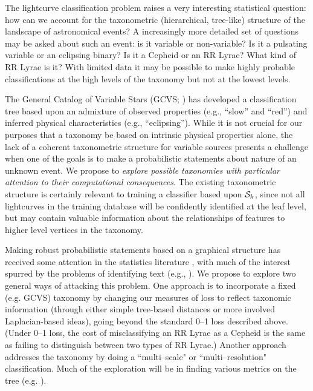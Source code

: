The lightcurve classification problem raises a very interesting statistical
question: how can we account for the taxonometric (hierarchical, tree-like)
structure of the landscape of astronomical events? A increasingly more detailed
set of questions may be asked about such an event: is it variable or
non-variable? Is it a pulsating variable or an eclipsing binary?  Is it a
Cepheid or an RR Lyrae? What kind of RR Lyrae is it?  With limited data it may
be possible to make highly probable classifications at the high levels of the
taxonomy but not at the lowest levels.

The General Catalog of Variable Stars (GCVS; \citealt{ksf+96}) has developed a
classification tree based upon an admixture of observed properties (e.g.,
``slow'' and ``red'') and inferred physical characteristics (e.g.,
``eclipsing'').  While it is not crucial for our purposes that a taxonomy be
based on intrinsic physical properties alone, the lack of a coherent
taxonometric structure for variable sources presents a challenge when one of the
goals is to make a  probabilistic statements about nature of an unknown event.
We propose to {\it explore possible taxonomies with particular attention to
their computational consequences}.  The existing taxonometric structure is
certainly relevant to training a classifier based upon ${\cal S}_k$, since not
all lightcurves in the training database will be confidently identified at the
leaf level, but may contain valuable information about the relationships of
features to higher level vertices in the taxonomy.

Making robust probabilistic statements based on a graphical structure has
received some attention in the statistics literature
\citep{DBLP:conf/icml/KollerS97,DBLP:conf/icdm/SunL01,DBLP:conf/icml/DekelKS04,
CesaBianchi06,  bcmt-lmmsc-04}, with much of the interest spurred by the
problems of identifying text (e.g., \citealt{593971}). We propose to explore two
general ways of attacking this problem. One approach is to incorporate a fixed
(e.g. GCVS) taxonomy by changing our measures of loss to reflect taxonomic
information (through either simple tree-based distances or more involved
Laplacian-based ideas), going beyond the standard 0--1 loss described above.
(Under 0--1 loss, the cost of misclassifying an RR Lyrae as a Cepheid is the
same as failing to distinguish between two types of RR Lyrae.) Another approach
addresses the taxonomy by doing a ``multi--scale" or ``multi--resolution"
classification. Much of the exploration will be in finding various metrics on
the tree (e.g. \citealt{ChungSpectralGraphTheoryBook97}).

